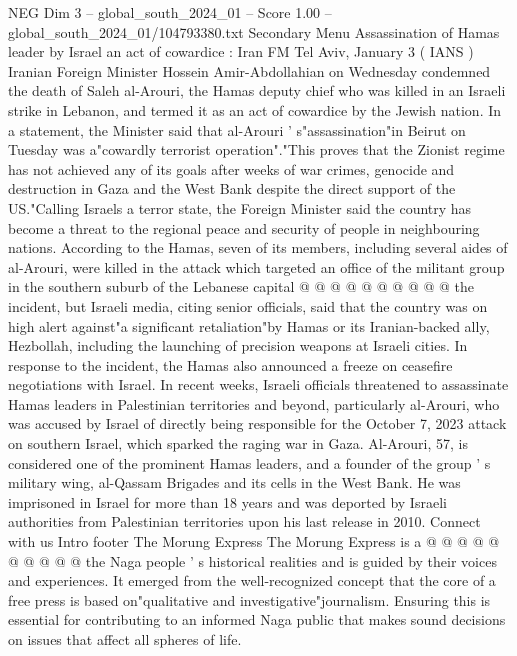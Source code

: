 \begin{textsample}{NEG Dim 3 – global\_south\_2024\_01 – Score 1.00 – global\_south\_2024\_01/104793380.txt}  \label{ex:f3_neg_107}
Secondary Menu Assassination of Hamas leader by Israel an act of cowardice : Iran FM Tel Aviv, January 3 ( IANS ) Iranian Foreign Minister Hossein Amir-Abdollahian on Wednesday condemned the death of Saleh al-Arouri, the Hamas deputy chief who was killed in an Israeli strike in Lebanon, and termed it as an act of cowardice by the Jewish nation.
In a statement, the Minister said that al-Arouri ' s"assassination"in Beirut on Tuesday was a"cowardly terrorist operation"."This proves that the Zionist regime has not achieved any of its goals after weeks of war crimes, genocide and destruction in Gaza and the West Bank despite the direct support of the US."Calling Israels a terror state, the Foreign Minister said the country has become a threat to the regional peace and security of people in neighbouring nations.
According to the Hamas, seven of its members, including several aides of al-Arouri, were killed in the attack which targeted an office of the militant group in the southern suburb of the Lebanese capital @ @ @ @ @ @ @ @ @ @ the incident, but Israeli media, citing senior officials, said that the country was on high alert against"a significant retaliation"by Hamas or its Iranian-backed ally, Hezbollah, including the launching of precision weapons at Israeli cities.
In response to the incident, the Hamas also announced a freeze on ceasefire negotiations with Israel.
In recent weeks, Israeli officials threatened to assassinate Hamas leaders in Palestinian territories and beyond, particularly al-Arouri, who was accused by Israel of directly being responsible for the October 7, 2023 attack on southern Israel, which sparked the raging war in Gaza.
Al-Arouri, 57, is considered one of the prominent Hamas leaders, and a founder of the group ' s military wing, al-Qassam Brigades and its cells in the West Bank.
He was imprisoned in Israel for more than 18 years and was deported by Israeli authorities from Palestinian territories upon his last release in 2010.
Connect with us Intro footer The Morung Express The Morung Express is a @ @ @ @ @ @ @ @ @ @ the Naga people ' s historical realities and is guided by their voices and experiences.
It emerged from the well-recognized concept that the core of a free press is based on"qualitative and investigative"journalism.
Ensuring this is essential for contributing to an informed Naga public that makes sound decisions on issues that affect all spheres of life.

\end{textsample}
